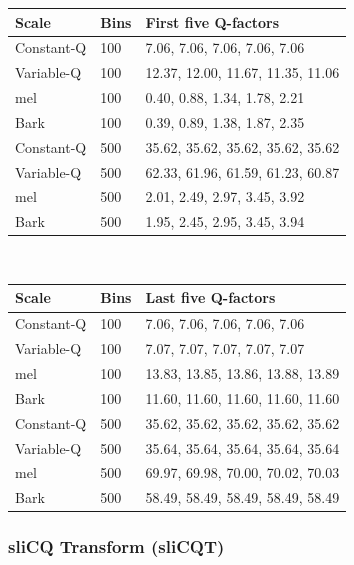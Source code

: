 \documentclass[report.tex]{subfiles}
\begin{document}
\begin{table}[ht]
\vspace{1em}
\begin{tabular}{ |l|l|p{10cm}| }
	 \hline
	 Scale & Bins & First five Q-factors \\
	 \hline
	 \hline
	 Constant-Q & 100 & 7.06, 7.06, 7.06, 7.06, 7.06  \\
	 \hline
	 Variable-Q & 100 & 12.37, 12.00, 11.67, 11.35, 11.06 \\
	 \hline
	 mel & 100 & 0.40, 0.88, 1.34, 1.78, 2.21 \\
	 \hline
	 Bark & 100 & 0.39, 0.89, 1.38, 1.87, 2.35 \\
	 \hline
	 Constant-Q & 500 & 35.62, 35.62, 35.62, 35.62, 35.62 \\
	 \hline
	 Variable-Q & 500 & 62.33, 61.96, 61.59, 61.23, 60.87 \\
	 \hline
	 mel & 500 & 2.01, 2.49, 2.97, 3.45, 3.92 \\
	 \hline
	 Bark & 500 & 1.95, 2.45, 2.95, 3.45, 3.94 \\
	 \hline
\end{tabular}\\
\vspace{1em}
\begin{tabular}{ |l|l|p{10cm}| }
	 \hline
	 Scale & Bins & Last five Q-factors \\
	 \hline
	 \hline
	 Constant-Q & 100 & 7.06, 7.06, 7.06, 7.06, 7.06  \\
	 \hline
	 Variable-Q & 100 & 7.07, 7.07, 7.07, 7.07, 7.07 \\
	 \hline
	 mel & 100 & 13.83, 13.85, 13.86, 13.88, 13.89 \\
	 \hline
	 Bark & 100 & 11.60, 11.60, 11.60, 11.60, 11.60 \\
	 \hline
	 Constant-Q & 500 & 35.62, 35.62, 35.62, 35.62, 35.62 \\
	 \hline
	 Variable-Q & 500 & 35.64, 35.64, 35.64, 35.64, 35.64 \\
	 \hline
	 mel & 500 & 69.97, 69.98, 70.00, 70.02, 70.03 \\
	 \hline
	 Bark & 500 & 58.49, 58.49, 58.49, 58.49, 58.49 \\
	 \hline
\end{tabular}
\end{table}

\newpagefill

\subsubsection{sliCQ Transform (sliCQT)}
\label{sec:theoryslicqt}
\end{document}
